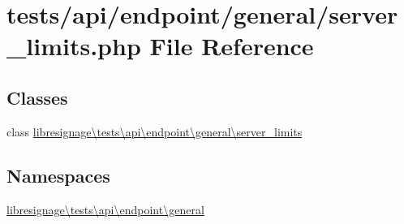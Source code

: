 \hypertarget{tests_2api_2endpoint_2general_2server__limits_8php}{}\section{tests/api/endpoint/general/server\+\_\+limits.php File Reference}
\label{tests_2api_2endpoint_2general_2server__limits_8php}
\subsection*{Classes}
\begin{DoxyCompactItemize}
\item 
class \hyperlink{classlibresignage_1_1tests_1_1api_1_1endpoint_1_1general_1_1server__limits}{libresignage\textbackslash{}tests\textbackslash{}api\textbackslash{}endpoint\textbackslash{}general\textbackslash{}server\+\_\+limits}
\end{DoxyCompactItemize}
\subsection*{Namespaces}
\begin{DoxyCompactItemize}
\item 
 \hyperlink{namespacelibresignage_1_1tests_1_1api_1_1endpoint_1_1general}{libresignage\textbackslash{}tests\textbackslash{}api\textbackslash{}endpoint\textbackslash{}general}
\end{DoxyCompactItemize}
